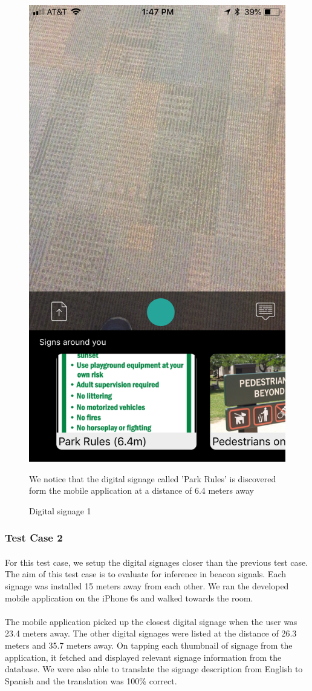 \documentclass[12pt]{article}
\begin{document}
       \begin{figure}[H]
	\centering
	\includegraphics[width=0.5\linewidth]{media/test1.png}
	\caption{Digital signage 1}{We notice that the digital signage called 'Park Rules' is discovered form the mobile application at a distance of 6.4 meters away}
	\label{fig:engyo}
\end{figure} 

\subsubsection{Test Case 2}
\label{one2one}
\paragraph{}For this test case, we setup the digital signages closer than the previous test case. The aim of this test case is to evaluate for inference in beacon signals. Each signage was installed  15 meters away from each other. We ran the developed mobile application on the iPhone 6s and walked towards the room.

\paragraph{}The mobile application picked up the closest digital signage when the user was 23.4 meters away. The other digital signages were listed at the distance of 26.3 meters and 35.7 meters away. On tapping each thumbnail of signage from the application, it fetched and displayed relevant signage information from the database. We were also able to translate the signage description from English to Spanish and the translation was 100\% correct.
\end{document}
